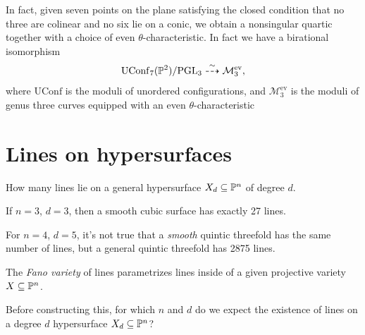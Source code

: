 \documentclass[11pt]{amsart}
\providecommand{\UConf}{\mathrm{UConf}}
\begin{document}
In fact, given seven points on the plane satisfying the closed condition that no three are colinear and no six lie on a conic, we obtain a nonsingular quartic together with a choice of even $\theta$-characteristic. In fact we have a birational isomorphism
\begin{align*}
    \UConf_7(\P^2)/\PGL_3 \overset{\sim}{\dashto} \mathcal{M}_3^\text{ev},
\end{align*}
where $\UConf$ is the moduli of unordered configurations, and $\mathcal{M}_3^\text{ev}$ is the moduli of genus three curves equipped with an even $\theta$-characteristic \cite[6.3.12]{Dolgachev}

\section{Lines on hypersurfaces}

\begin{question} How many lines lie on a general hypersurface $X_d \subseteq \P^n$ of degree $d$.
\end{question}

If $n=3$, $d=3$, then a smooth cubic surface has exactly 27 lines.

For $n=4$, $d=5$, it's not true that a \textit{smooth} quintic threefold has the same number of lines, but a general quintic threefold has 2875 lines.

The \textit{Fano variety} of lines parametrizes lines inside of a given projective variety $X \subseteq \P^n$.

\begin{question} Before constructing this, for which $n$ and $d$ do we expect the existence of lines on a degree $d$ hypersurface $X_d \subseteq \P^n$?
\end{question}
\end{document}
